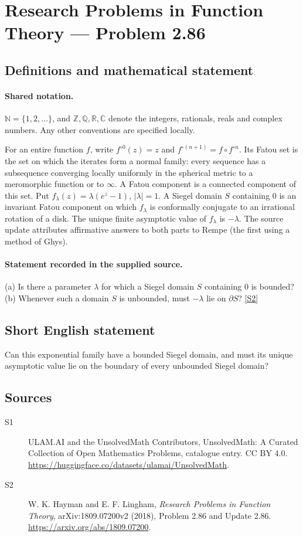 \documentclass[11pt]{article}
\newcommand{\sref}[2]{\hyperlink{source:#1:#2}{[S#2]}}
\begin{document}
\section{Research Problems in Function Theory — Problem 2.86}\label{statement}

\subsection{Definitions and mathematical statement}

\paragraph{Shared notation.}$\mathbb N=\{1,2,\ldots\}$, and $\mathbb Z,\mathbb Q,\mathbb R,\mathbb C$ denote the integers, rationals, reals and complex numbers. Any other conventions are specified locally.


For an entire function $f$, write $f^{\circ0}(z)=z$ and $f^{\circ(n+1)}=f\circ f^{\circ n}$. Its Fatou set is the set on which the iterates form a normal family: every sequence has a subsequence converging locally uniformly in the spherical metric to a meromorphic function or to $\infty$. A Fatou component is a connected component of this set. Put $f_\lambda(z)=\lambda(e^z-1)$, $|\lambda|=1$. A Siegel domain $S$ containing $0$ is an invariant Fatou component on which $f_\lambda$ is conformally conjugate to an irrational rotation of a disk. The unique finite asymptotic value of $f_\lambda$ is $-\lambda$.
The source update attributes affirmative answers to both parts to Rempe (the first using a method of Ghys).
\paragraph{Statement recorded in the supplied source.}
(a) Is there a parameter $\lambda$ for which a Siegel domain $S$ containing $0$ is bounded? (b) Whenever such a domain $S$ is unbounded, must $-\lambda$ lie on $\partial S$? \sref{statement}{2}
\subsection{Short English statement}
Can this exponential family have a bounded Siegel domain, and must its unique asymptotic value lie on the boundary of every unbounded Siegel domain?
\subsection{Sources}
\begin{description}
\item[\hypertarget{source:statement:1}{S1}] ULAM.AI and the UnsolvedMath Contributors, UnsolvedMath: A Curated Collection of Open Mathematics Problems, catalogue entry. CC BY 4.0. \url{https://huggingface.co/datasets/ulamai/UnsolvedMath}.
\item[\hypertarget{source:statement:2}{S2}] W. K. Hayman and E. F. Lingham, \emph{Research Problems in Function Theory}, arXiv:1809.07200v2 (2018), Problem 2.86 and Update 2.86. \url{https://arxiv.org/abs/1809.07200}.
\end{description}
\label{end:statement}
\end{document}
